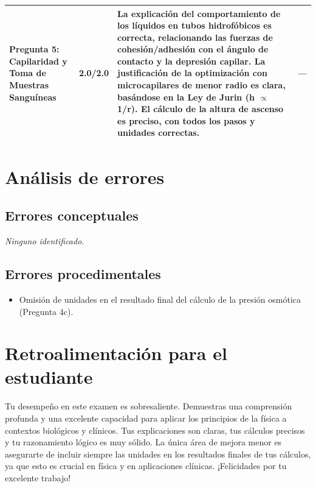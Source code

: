 \documentclass[11pt,a4paper]{article}
\begin{document}
\begin{longtable}{>{\bfseries}p{2.8cm} p{1.6cm} p{7.0cm} p{2.8cm}}
    \midrule
    \textbf{Pregunta 5: Capilaridad y Toma de Muestras Sanguíneas} & 2.0/2.0 & La explicación del comportamiento de los líquidos en tubos hidrofóbicos es correcta, relacionando las fuerzas de cohesión/adhesión con el ángulo de contacto y la depresión capilar. La justificación de la optimización con microcapilares de menor radio es clara, basándose en la Ley de Jurin (h $\propto$ 1/r). El cálculo de la altura de ascenso es preciso, con todos los pasos y unidades correctas. & \textit{---} \\
    \midrule
\end{longtable}

\section*{Análisis de errores}

\subsection*{Errores conceptuales}
\textit{Ninguno identificado.}

\subsection*{Errores procedimentales}
\begin{itemize}[leftmargin=1.5em, itemsep=2pt]
  \item Omisión de unidades en el resultado final del cálculo de la presión osmótica (Pregunta 4c).
\end{itemize}

\section*{Retroalimentación para el estudiante}
\begin{tcolorbox}[cajaRecomendacion, title={Dirigido a: Ana Alcala}]
Tu desempeño en este examen es sobresaliente. Demuestras una comprensión profunda y una excelente capacidad para aplicar los principios de la física a contextos biológicos y clínicos. Tus explicaciones son claras, tus cálculos precisos y tu razonamiento lógico es muy sólido. La única área de mejora menor es asegurarte de incluir siempre las unidades en los resultados finales de tus cálculos, ya que esto es crucial en física y en aplicaciones clínicas. ¡Felicidades por tu excelente trabajo!
\end{tcolorbox}
\end{document}
